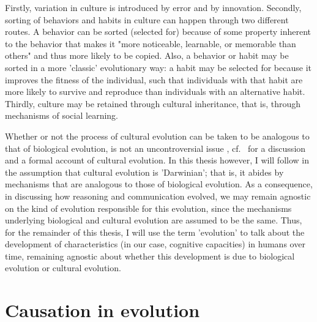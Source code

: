 Firstly, variation in culture is introduced by error and by innovation.
Secondly, sorting of behaviors and habits in culture can happen through two different routes. A behavior can be sorted (selected for) because of some property inherent to the behavior that makes it "more noticeable, learnable, or memorable than others" \citep[p.~34]{Heyes18} and thus more likely to be copied. Also, a behavior or habit may be sorted in a more 'classic' evolutionary way: a habit may be selected for because it improves the fitness of the individual, such that individuals with that habit are more likely to survive and reproduce than individuals with an alternative habit.
Thirdly, culture may be retained through cultural inheritance, that is, through mechanisms of social learning.

Whether or not the process of cultural evolution can be taken to be analogous to that of biological evolution, is not an uncontroversial issue , cf.~\citet{Claidiere14} for a discussion and a formal account of cultural evolution.
In this thesis however, I will follow \citet{Heyes18} in the assumption that cultural evolution is 'Darwinian'; that is, it abides by mechanisms that are analogous to those of biological evolution.
As a consequence, in discussing how reasoning and communication evolved, we may remain agnostic on the kind of evolution responsible for this evolution, since the mechanisms underlying biological and cultural evolution are assumed to be the same.
Thus, for the remainder of this thesis, I will use the term 'evolution' to talk about the development of characteristics (in our case, cognitive capacities) in humans over time, remaining agnostic about whether this development is due to biological evolution or cultural evolution.


\section{Causation in evolution}
\label{sec:causation-evolution}

